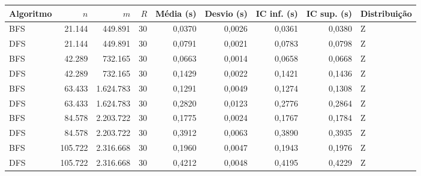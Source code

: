 \begin{tabular}{lrrrrrrrl}
\toprule
Algoritmo & $n$ & $m$ & $R$ & Média (s) & Desvio (s) & IC inf. (s) & IC sup. (s) & Distribuição \\
\midrule
BFS & 21.144 & 449.891 & 30 & 0,0370 & 0,0026 & 0,0361 & 0,0380 & Z \\
DFS & 21.144 & 449.891 & 30 & 0,0791 & 0,0021 & 0,0783 & 0,0798 & Z \\
BFS & 42.289 & 732.165 & 30 & 0,0663 & 0,0014 & 0,0658 & 0,0668 & Z \\
DFS & 42.289 & 732.165 & 30 & 0,1429 & 0,0022 & 0,1421 & 0,1436 & Z \\
BFS & 63.433 & 1.624.783 & 30 & 0,1291 & 0,0049 & 0,1274 & 0,1308 & Z \\
DFS & 63.433 & 1.624.783 & 30 & 0,2820 & 0,0123 & 0,2776 & 0,2864 & Z \\
BFS & 84.578 & 2.203.722 & 30 & 0,1775 & 0,0024 & 0,1767 & 0,1784 & Z \\
DFS & 84.578 & 2.203.722 & 30 & 0,3912 & 0,0063 & 0,3890 & 0,3935 & Z \\
BFS & 105.722 & 2.316.668 & 30 & 0,1960 & 0,0047 & 0,1943 & 0,1976 & Z \\
DFS & 105.722 & 2.316.668 & 30 & 0,4212 & 0,0048 & 0,4195 & 0,4229 & Z \\
\bottomrule
\end{tabular}
